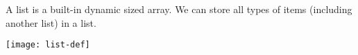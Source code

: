 \noindent
\begin{minipage}[c]{0.55\textwidth}
	A list is a built-in dynamic sized array. We can store all types of items (including another list) in a list.
\end{minipage}%
\hfill
\begin{minipage}[c]{0.4\textwidth}
	\texttt{[image: list-def]}
\end{minipage}